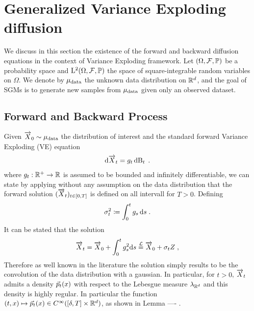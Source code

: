 \section{Generalized Variance Exploding diffusion}
We discuss in this section the existence of the forward and backward diffusion equations in the context of Variance Exploding framework. 
Let $(\Omega, \mathcal{F}, \mathbb{P})$ be a probability space and $\mathrm{L}^2(\Omega, \mathcal{F}, \mathbb{P})$ the space of square-integrable random variables on $\Omega$. We denote by $\mu_{\text{data}}$ the unknown data distribution on $\mathbb{R}^d$, and the goal of SGMs is to generate new samples from $\mu_{\text{data}}$ given only an observed dataset.
\subsection{Forward and Backward Process}
Given $\overrightarrow{X}_0 \sim \mu_{\text{data}}$ the distribution of interest and the standard forward Variance Exploding (VE) equation \citep{song2021scorebased}
\begin{equation}\label{eq:VE_SDE}
\mathrm{d} \overrightarrow{X}_t = g_t \, \mathrm{d}\!\operatorname{B}_t\;.
\end{equation}
where $g_t : \mathbb{R}^+ \to \mathbb{R}$ is assumed to be bounded and infinitely differentiable, we can state by applying \citet[Theorem 2.5]{karatzas1991brownian} without any assumption on the data distribution that the forward solution $(\overrightarrow{X}_t)_{t\in[0,T]}$ is defined on all intervall for $T>0$.
Defining 
\[
\sigma_t^2 \coloneqq \int_0^t g_s \, \mathrm{d} s\;.
\]
It can be stated that the solution
\[
\overrightarrow{X}_t = \overrightarrow{X}_0 + \int_{0}^{t} g_s ^2 \mathrm{d} s \overset{\mathcal{L}}{=} \overrightarrow{X}_0 + \sigma_t Z\;,
\]
Therefore as well known in the literature the solution simply results to be the convolution of the data distribution with a gaussian. 
In particular, for $t>0$, $\overrightarrow{X}_t$ admits a density $\vec{ p}_{t}(x)$ with respect to the Lebesgue measure $\lambda_{\mathbb{R}^d}$ and this density is highly regular. In particular the function $ (t,x)\mapsto\vec{ p}_{t}(x) \in C^{\infty}([\delta, T] \times \mathbb{R}^d)$, as shown in Lemma ---- . 

